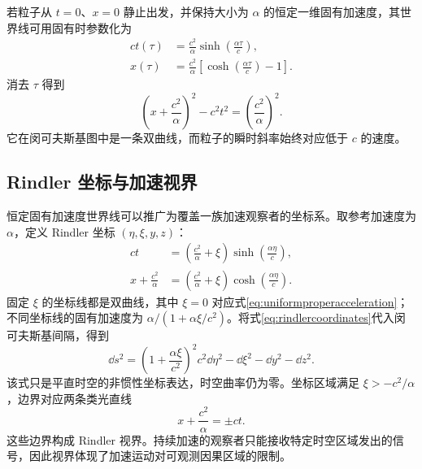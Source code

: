 \documentclass[style=classic,color=full]{lc-article}
\begin{document}
若粒子从 $t=0$、$x=0$ 静止出发，并保持大小为 $\alpha$ 的恒定一维固有加速度，其世界线可用固有时参数化为
\begin{equation}
  \begin{aligned}
    ct(\tau)&=\frac{c^2}{\alpha}
      \sinh\left(\frac{\alpha\tau}{c}\right),\\
    x(\tau)&=\frac{c^2}{\alpha}
      \left[\cosh\left(\frac{\alpha\tau}{c}\right)-1\right].
  \end{aligned}
  \label{eq:uniformproperacceleration}
\end{equation}
消去 $\tau$ 得到
\begin{equation}
  \boxed{
  \left(x+\frac{c^2}{\alpha}\right)^2-c^2t^2
  =\left(\frac{c^2}{\alpha}\right)^2.}
  \label{eq:accelerationhyperbola}
\end{equation}
它在闵可夫斯基图中是一条双曲线，而粒子的瞬时斜率始终对应低于 $c$ 的速度。


\subsection{Rindler 坐标与加速视界}

恒定固有加速度世界线可以推广为覆盖一族加速观察者的坐标系。取参考加速度为 $\alpha$，定义 Rindler 坐标 $(\eta,\xi,y,z)$：
\begin{equation}
  \begin{aligned}
    ct&=\left(\frac{c^2}{\alpha}+\xi\right)
      \sinh\left(\frac{\alpha\eta}{c}\right),\\
    x+\frac{c^2}{\alpha}
      &=\left(\frac{c^2}{\alpha}+\xi\right)
      \cosh\left(\frac{\alpha\eta}{c}\right).
  \end{aligned}
  \label{eq:rindlercoordinates}
\end{equation}
固定 $\xi$ 的坐标线都是双曲线，其中 $\xi=0$ 对应式\eqref{eq:uniformproperacceleration}；不同坐标线的固有加速度为 $\alpha/(1+\alpha\xi/c^2)$。将式\eqref{eq:rindlercoordinates}代入闵可夫斯基间隔，得到
\begin{equation}
  \dd s^2
  =\left(1+\frac{\alpha\xi}{c^2}\right)^2
    c^2\dd\eta^2
  -\dd\xi^2-\dd y^2-\dd z^2.
  \label{eq:rindlermetric}
\end{equation}
该式只是平直时空的非惯性坐标表达，时空曲率仍为零。坐标区域满足 $\xi>-c^2/\alpha$，边界对应两条类光直线
\begin{equation}
  x+\frac{c^2}{\alpha}=\pm ct.
\end{equation}
这些边界构成 Rindler 视界。持续加速的观察者只能接收特定时空区域发出的信号，因此视界体现了加速运动对可观测因果区域的限制\cite{rindler}。
\end{document}
